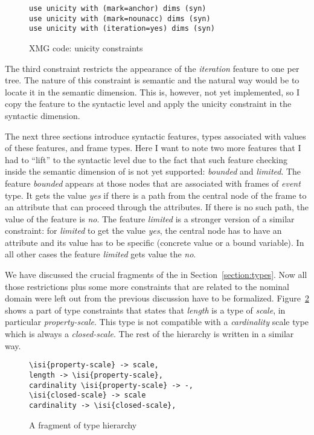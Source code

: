 \begin{figure}
\begin{lstlisting}[style=xmg]
use unicity with (mark=anchor) dims (syn)
use unicity with (mark=nounacc) dims (syn)
use unicity with (iteration=yes) dims (syn)
\end{lstlisting}
\caption{XMG code: unicity constraints \label{xmg:unicity}}
\end{figure}

The third constraint restricts the appearance of the \textit{iteration} feature to one per tree. The nature of this constraint is semantic and the natural way would be to locate it in the semantic dimension. This is, however, not yet implemented, so I copy the feature to the syntactic level and apply the unicity constraint in the syntactic dimension.

The next three sections introduce syntactic features, types associated with values of these features, and frame types. Here I want to note two more features that I had to ``lift'' to the syntactic level due to the fact that such feature checking inside the semantic dimension of  is not yet supported: \textit{bounded} and \textit{limited}. The feature \textit{bounded} appears at those nodes that are associated with frames of \textit{event} type. It gets the value \textit{yes} if there is a path from the central node of the frame to an attribute \FIN that can proceed through the \PARTOF attributes. If there is no such path, the value of the feature is \textit{no}. The feature \textit{limited} is a stronger version of a similar constraint: for \textit{limited} to get the value \textit{yes}, the central node has to have an attribute \FIN and its value has to be specific (concrete value or a bound variable). In all other cases the feature \textit{limited} gets value the \textit{no}.

We have discussed the crucial fragments of the  in Section~\ref{section:types}. Now all those restrictions plus some more constraints that are related to the nominal domain were left out from the previous discussion have to be formalized. Figure~\ref{xmg:types} shows a part of type constraints that states that \textit{length} is a type of \textit{scale}, in particular \textit{property-scale}. This type is not compatible with a \textit{cardinality} scale type which is always a \textit{closed-scale}. The rest of the hierarchy is written in a similar way.

\begin{figure}
\begin{lstlisting}[style=xmg]
\isi{property-scale} -> scale,
length -> \isi{property-scale},
cardinality \isi{property-scale} -> -,
\isi{closed-scale} -> scale
cardinality -> \isi{closed-scale},
\end{lstlisting}
\caption{A fragment of type hierarchy \label{xmg:types}}
\end{figure}

